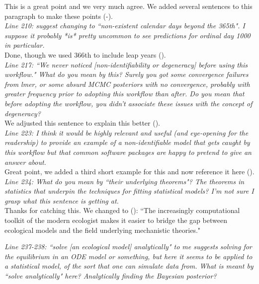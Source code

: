 \documentclass[11pt,a4paper]{article}
\begin{document}
This is a great point and we very much agree. We added several sentences to this paragraph to make these points (-).\\

\emph{Line 210: suggest changing to ``non-existent calendar days beyond the 365th". I suppose it probably *is* pretty uncommon to see predictions for ordinal day 1000 in particular.}\\

Done, though we used 366th to include leap years ().\\

\emph{Line 217: ``We never noticed [non-identifiability or degeneracy] before using this workflow." What do you mean by this? Surely you got some convergence failures from lmer, or some absurd MCMC posteriors with no convergence, probably with greater frequency prior to adopting this workflow than after. Do you mean that before adopting the workflow, you didn't associate these issues with the concept of degeneracy?}\\

We adjusted this sentence to explain this better ().\\

\emph{Line 223: I think it would be highly relevant and useful (and eye-opening for the readership) to provide an example of a non-identifiable model that gets caught by this workflow but that common software packages are happy to pretend to give an answer about.}\\

Great point, we added a third short example for this and now reference it here ().\\

\emph{Line 234: What do you mean by ``their underlying theorems"? The theorems in statistics that underpin the techniques for fitting statistical models? I'm not sure I grasp what this sentence is getting at.}\\

Thanks for catching this. We changed to (): ``The increasingly computational toolkit of the modern ecologist makes it easier to bridge the gap between ecological models and the field underlying mechanistic theories."

\emph{Line 237-238: ``solve [an ecological model] analytically" to me suggests solving for the equilibrium in an ODE model or something, but here it seems to be applied to a statistical model, of the sort that one can simulate data from. What is meant by ``solve analytically" here? Analytically finding the Bayesian posterior?}\\
\end{document}
